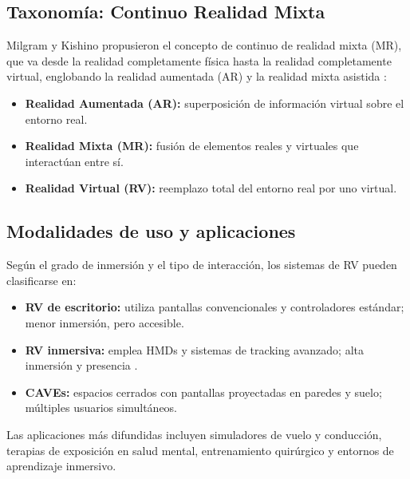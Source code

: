 \subsection{Taxonomía: Continuo Realidad Mixta}

Milgram y Kishino propusieron el concepto de continuo de realidad mixta (MR), que va desde la realidad completamente física hasta la realidad completamente virtual, englobando la realidad aumentada (AR) y la realidad mixta asistida \cite{milgram94}:
\begin{itemize}
  \item \textbf{Realidad Aumentada (AR):} superposición de información virtual sobre el entorno real.
  \item \textbf{Realidad Mixta (MR):} fusión de elementos reales y virtuales que interactúan entre sí.
  \item \textbf{Realidad Virtual (RV):} reemplazo total del entorno real por uno virtual.
\end{itemize}

\subsection{Modalidades de uso y aplicaciones}

Según el grado de inmersión y el tipo de interacción, los sistemas de RV pueden clasificarse en:
\begin{itemize}
  \item \textbf{RV de escritorio:} utiliza pantallas convencionales y controladores estándar; menor inmersión, pero accesible.
  \item \textbf{RV inmersiva:} emplea HMDs y sistemas de tracking avanzado; alta inmersión y presencia \cite{burdea2003}.
  \item \textbf{CAVEs:} espacios cerrados con pantallas proyectadas en paredes y suelo; múltiples usuarios simultáneos.
\end{itemize}

Las aplicaciones más difundidas incluyen simuladores de vuelo y conducción, terapias de exposición en salud mental, entrenamiento quirúrgico y entornos de aprendizaje inmersivo.

